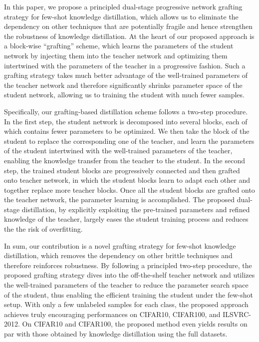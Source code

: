 \documentclass[letterpaper]{article} %
\begin{document}
{    In this paper, we propose a principled dual-stage 
    progressive network grafting strategy 
    for few-shot knowledge distillation,
    which allows us to eliminate the dependency on
    other techniques that are potentially fragile
    and hence strengthen the robustness of knowledge distillation.
    At the heart of our proposed approach is a
    block-wise ``grafting'' scheme, which 
    learns the parameters of the student network
    by injecting them into the teacher network
    and optimizing them intertwined with the 
    parameters of the teacher in a progressive fashion.
    Such a grafting strategy takes much better advantage of 
    the well-trained parameters of the teacher network
    and therefore significantly shrinks parameter space of the student network, 
    allowing us to training the student with much fewer samples.
    
    Specifically, our grafting-based distillation scheme follows
    a two-step procedure. In the first step, the student network is decomposed
    into several blocks, each of which contains fewer parameters to be optimized.
    We then take the block of the student to replace the corresponding
    one of the teacher, and learn the parameters of the student intertwined 
    with the well-trained parameters of the teacher, enabling the 
    knowledge transfer from the teacher to the student. 
    In the second step, the trained student blocks 
    are progressively connected and then grafted onto teacher network, 
    in which the student blocks learn to adapt each other and 
    together replace more teacher blocks. 
    Once all the student blocks are grafted onto the teacher network,
    the parameter learning is accomplished. 
    The proposed dual-stage distillation, by explicitly exploiting
    the pre-trained parameters and refined knowledge of the teacher,
    largely eases the student training process and reduces the 
    the risk of overfitting. 
    
    In sum, our contribution is a novel grafting 
    strategy for few-shot knowledge distillation, 
    which removes the dependency on other brittle 
    techniques and therefore reinforces robustness. 
    By following a principled two-step procedure, 
    the proposed grafting strategy dives into 
    the off-the-shelf teacher network
    and utilizes the well-trained parameters of the teacher
    to reduce the parameter search space of the student,
    thus enabling the efficient training the student under
    the few-shot setup. 
    With only a few unlabeled samples for each class, 
    the proposed approach achieves truly encouraging performances
    on CIFAR10, CIFAR100, and ILSVRC-2012.
    On  CIFAR10 and CIFAR100, the proposed method even yields results
    on par with those obtained by knowledge distillation using the full datasets.
    
}
\end{document}
